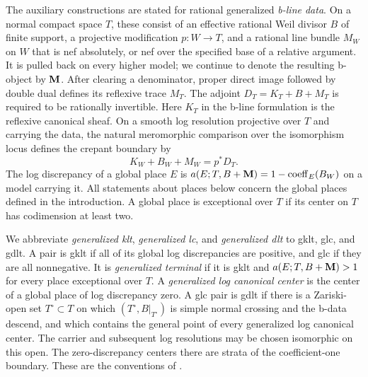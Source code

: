 The auxiliary constructions are stated for rational generalized
\emph{b-line data}.  On a normal compact space \(T\), these consist of an
effective rational Weil divisor \(B\) of finite support, a projective
modification \(p:W\to T\), and a rational line bundle \(M_W\) on \(W\)
that is nef absolutely, or nef over the specified base of a relative
argument.  It is pulled back on every higher model; we continue to denote
the resulting b-object by \(\mathbf{M}\).  After clearing a denominator, proper
direct image followed by double dual defines its reflexive trace \(M_T\).
The adjoint \(D_T=K_T+B+M_T\) is required to be rationally invertible.
Here \(K_T\) in the b-line formulation is the reflexive canonical sheaf.
On a smooth log resolution projective over \(T\) and carrying the data, the natural
meromorphic comparison over the isomorphism locus defines the crepant
boundary by
\[
 K_W+B_W+M_W=p^*D_T.
\]
The log discrepancy of a global place \(E\) is
\(a(E;T,B+\mathbf{M})=1-\operatorname{coeff}_E(B_W)\) on a model carrying it.
All statements about places below concern the global places defined in the
introduction.  A global place is exceptional over \(T\) if its center on
\(T\) has codimension at least two.

We abbreviate \emph{generalized klt}, \emph{generalized lc}, and
\emph{generalized dlt} to gklt, glc, and gdlt.  A pair is gklt if all of
its global log discrepancies are positive, and glc if they are all
nonnegative.  It is \emph{generalized terminal} if it is gklt and
\(a(E;T,B+\mathbf{M})>1\) for every place exceptional over \(T\).  A
\emph{generalized log canonical center} is the center of a global place of
log discrepancy zero.  A glc pair is gdlt if there is a Zariski-open set
\(T^\circ\subset T\) on which \((T^\circ,B|_{T^\circ})\) is simple normal
crossing and the b-data descend, and which contains the general point of
every generalized log canonical center.  The carrier and subsequent log
resolutions may be chosen isomorphic on this open.  The zero-discrepancy
centers there are strata of the coefficient-one boundary.  These are the
conventions of \cite[Convention~9.1 and Definition~9.2]{KahlerAuxiliary}.

